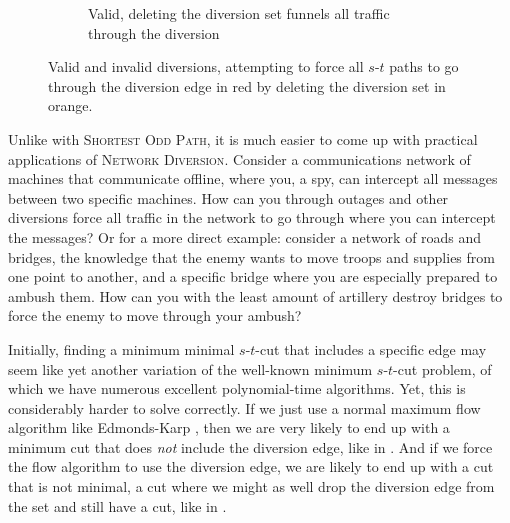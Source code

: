 \begin{figure}[H]
\begin{subfigure}{.3\textwidth}
        \caption{Valid, deleting the diversion set funnels all traffic through the diversion}
        \label{subfigure:valid-diversion}
    \end{subfigure}
    \caption{Valid and invalid diversions, attempting to force all $s$-$t$ paths to go through the diversion edge in red by deleting the diversion set in orange.}
    \label{figure:diversion-attempts}
\end{figure}

Unlike with \textsc{Shortest Odd Path}, it is much easier to come up with practical applications of \textsc{Network Diversion}. Consider a communications network of machines that communicate offline, where you, a spy, can intercept all messages between two specific machines. How can you through outages and other diversions force all traffic in the network to go through where you can intercept the messages? Or for a more direct example: consider a network of roads and bridges, the knowledge that the enemy wants to move troops and supplies from one point to another, and a specific bridge where you are especially prepared to ambush them. How can you with the least amount of artillery destroy bridges to force the enemy to move through your ambush?

Initially, finding a minimum minimal $s$-$t$-cut that includes a specific edge may seem like yet another variation of the well-known minimum $s$-$t$-cut problem, of which we have numerous excellent polynomial-time algorithms. Yet, this is considerably harder to solve correctly. If we just use a normal maximum flow algorithm like Edmonds-Karp \cite{source:edmonds-karp-algorithn}, then we are very likely to end up with a minimum cut that does \emph{not} include the diversion edge, like in . And if we force the flow algorithm to use the diversion edge, we are likely to end up with a cut that is not minimal, a cut where we might as well drop the diversion edge from the set and still have a cut, like in .

